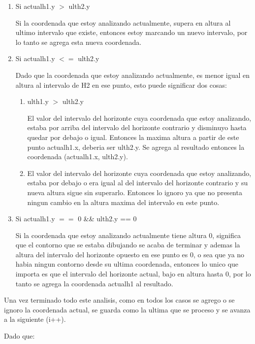 \begin{enumerate}
\begin{enumerate}
\item Si actualh1.y $>$ ulth2.y

Si la coordenada que estoy analizando actualmente, supera en altura al ultimo intervalo que existe, entonces estoy marcando un nuevo intervalo, por lo tanto se agrega esta nueva coordenada.
\item Si actualh1.y $<=$ ulth2.y

Dado que la coordenada que estoy analizando actualmente, es menor igual en altura al intervalo de H2 en ese punto, esto puede significar dos cosas: 
\begin{enumerate}
\item ulth1.y $>$ ulth2.y

El valor del intervalo del horizonte cuya coordenada que estoy analizando, estaba por arriba del intervalo del horizonte contrario y disminuyo hasta quedar por debajo o igual. Entonces la maxima altura a partir de este punto actualh1.x, deberia ser ulth2.y. Se agrega al resultado entonces la coordenada (actualh1.x, ulth2.y).
\item El valor del intervalo del horizonte cuya coordenada que estoy analizando, estaba por debajo o era igual al del intervalo del horizonte contrario y su nueva altura sigue sin superarlo. Entonces lo ignoro ya que no presenta ningun cambio en la altura maxima del intervalo en este punto.
\end{enumerate}


\item Si actualh1.y $==$ 0 \&\& ulth2.y == 0

Si la coordenada que estoy analizando actualmente tiene altura 0, significa que el contorno que se estaba dibujando se acaba de terminar y ademas la altura del intervalo del horizonte opuesto en ese punto es 0, o sea que ya no habia ningun contorno desde su ultima coordenada, entonces lo unico que importa es que el intervalo del horizonte actual, bajo en altura hasta 0, por lo tanto se agrega la coordenada actualh1 al resultado.
\end{enumerate}

Una vez terminado todo este analisis, como en todos los casos se agrego o se ignoro la coordenada actual, se guarda como la ultima que se proceso y se avanza a la siguiente (i++).

Dado que:


\end{enumerate}
